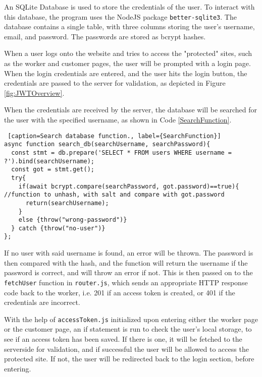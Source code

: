 An SQLite Database is used to store the credentials of the user. To interact with this database, the program uses the NodeJS package \lstinline{better-sqlite3}. The database contains a single table, with three columns storing the user's username, email, and password. The passwords are stored as bcrypt hashes. 


When a user logs onto the website and tries to access the "protected" sites, such as the worker and customer pages, the user will be prompted with a login page. When the login credentials are entered, and the user hits the login button, the credentials are passed to the server for validation, as depicted in Figure \ref{fig:JWTOverview}. 

When the credentials are received by the server, the database will be searched for the user with the specified username, as shown in Code \ref{SearchFunction}. 

\begin{lstlisting} [caption=Search database function., label={SearchFunction}]
async function search_db(searchUsername, searchPassword){
  const stmt = db.prepare('SELECT * FROM users WHERE username = ?').bind(searchUsername);
  const got = stmt.get(); 
  try{
    if(await bcrypt.compare(searchPassword, got.password)==true){ //function to unhash, with salt and compare with got.password
      return(searchUsername);
    }
    else {throw("wrong-password")}
  } catch {throw("no-user")}
};

\end{lstlisting}

If no user with said username is found, an error will be thrown. The password is then compared with the hash, and the function will return the username if the password is correct, and will throw an error if not. This is then passed on to the \lstinline{fetchUser} function in \lstinline{router.js}, which sends an appropriate HTTP response code back to the worker, i.e. 201 if an access token is created, or 401 if the credentials are incorrect. 

With the help of \lstinline{accessToken.js} initialized upon entering either the worker page or the customer page, an if statement is run to check the user's local storage, to see if an access token has been saved. If there is one, it will be fetched to the serverside for validation, and if successful the user will be allowed to access the protected site. If not, the user will be redirected back to the login section, before entering.